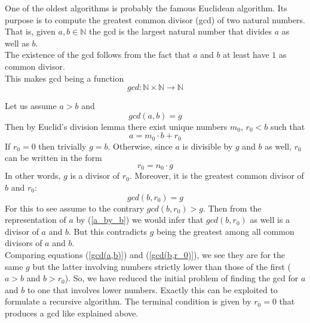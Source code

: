 \documentclass[17pt]{extarticle}
\begin{document}
One of the oldest algorithms is probably the famous Euclidean algorithm.
Its purpose is to compute the greatest common divisor (gcd) of two natural numbers.\\
That is, given $a,b\in\mathbb{N}$ the gcd is the largest natural number that divides $a$ as well as $b$.\\
The existence of the gcd follows from the fact that $a$ and $b$ at least have $1$ as common divisor.\\
This makes gcd being a function
$$gcd:\mathbb{N}\times\mathbb{N}\rightarrow \mathbb{N}$$

Let us assume $a>b$ and
\begin{equation} \label{gcd(a,b)}
gcd(a,b)=g
\end{equation}
Then by Euclid's division lemma there exist unique numbers $m_0$, $r_0<b$ such that
\begin{equation} \label{a_by_b}
a=m_0\cdot b+r_0
\end{equation}
If $r_0=0$ then trivially $g=b$.
Otherwise, since $a$ is divisible by $g$ and $b$ as well, $r_0$ can be written in the form
$$r_0=n_0\cdot g$$
In other words, $g$ is a divisor of $r_0$. Moreover, it is the greatest common divisor of
$b$ and $r_0$:
\begin{equation} \label{gcd(b,r_0)}
gcd(b, r_0)=g
\end{equation}
For this to see assume to the contrary $gcd(b, r_0)>g$. Then from the representation of $a$ by (\ref{a_by_b}) we would infer that $gcd(b, r_0)$ as well is a divisor of $a$ and $b$. But this contradicts
$g$ being the greatest among all common divisors of $a$ and $b$.\\
Comparing equations (\ref{gcd(a,b)}) and (\ref{gcd(b,r_0)}), we see they are for the same $g$ but
the latter involving numbers strictly lower than those of the first ($a>b$ and $b>r_0$).
So, we have reduced the initial problem of finding the gcd for $a$ and $b$ to one that involves lower
numbers. Exactly this can be exploited to formulate a recursive algorithm. The terminal condition is given by $r_0=0$ that produces a gcd like explained above.
\end{document}
